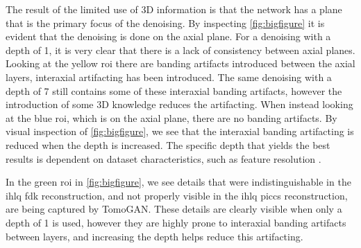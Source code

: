 The result of the limited use of 3D information is that the network has a plane that is the primary focus of the denoising. By inspecting \cref{fig:bigfigure} it is evident that the denoising is done on the axial plane. For a denoising with a depth of 1, it is very clear that there is a lack of consistency between axial planes. Looking at the yellow \gls{roi} there are banding artifacts introduced between the axial layers, interaxial artifacting has been introduced. The same denoising with a depth of 7 still contains some of these interaxial banding artifacts, however the introduction of some 3D knowledge reduces the artifacting. When instead looking at the blue \gls{roi}, which is on the axial plane, there are no banding artifacts. By visual inspection of \cref{fig:bigfigure}, we see that the interaxial banding artifacting is reduced when the depth is increased. The specific depth that yields the best results is dependent on dataset characteristics, such as feature resolution \cite{liu2020tomogan}. 

In the green \gls{roi} in \cref{fig:bigfigure}, we see details that were indistinguishable in the \gls{ihlq} \gls{fdk} reconstruction, and not properly visible in the \gls{ihlq} \gls{piccs} reconstruction, are being captured by TomoGAN. These details are clearly visible when only a depth of 1 is used, however they are highly prone to interaxial banding artifacts between layers, and increasing the depth helps reduce this artifacting. 


